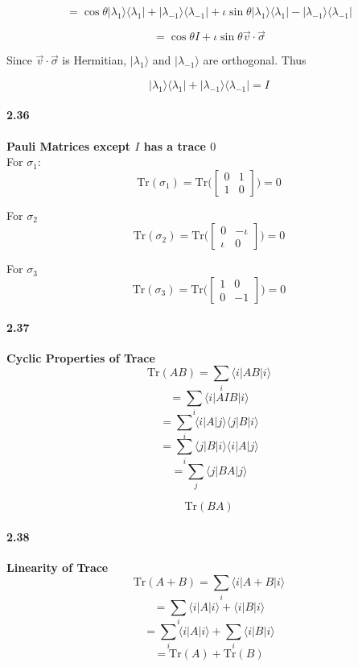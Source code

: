 $$ = \cos{\theta}|\lambda_1\rangle \langle \lambda_1| +  |\lambda_{-1} \rangle \langle \lambda_{-1}| + \iota \sin{\theta} |\lambda_1\rangle \langle \lambda_1| -  |\lambda_{-1} \rangle \langle \lambda_{-1}|  $$

$$ = \cos{\theta} I + \iota \sin{\theta} \vec{v} \cdot \vec{\sigma}$$

Since $\vec{v}\cdot \vec{\sigma}$ is Hermitian, $|\lambda_1\rangle$ and $|\lambda_{-1}\rangle$ are orthogonal. Thus

$$ |\lambda_1 \rangle \langle \lambda_1| + |\lambda_{-1}\rangle \langle \lambda_{-1}| = I$$

\paragraph{2.36} \textbf{Pauli Matrices except $I$ has a trace $0$}%
\\
For $\sigma_1$:
$$ \text{Tr}(\sigma_1) = \text{Tr}\bigg( \begin{bmatrix}
    0 & 1 \\ 1 & 0 
\end{bmatrix} \bigg) = 0 $$

For $\sigma_2$
$$ \text{Tr}(\sigma_2) = \text{Tr}\bigg( \begin{bmatrix}
    0 & -\iota \\ \iota & 0 
\end{bmatrix} \bigg) = 0 $$


For $\sigma_3$
$$ \text{Tr}(\sigma_3) = \text{Tr}\bigg( \begin{bmatrix}
    1 & 0 \\ 0 & -1 
\end{bmatrix} \bigg) = 0 $$


\paragraph{2.37} \textbf{Cyclic Properties of Trace}%
\\

$$ \text{Tr} (AB) = \sum_i \langle i |AB|i\rangle$$
$$ = \sum_i \langle i |AIB|i\rangle$$
$$  = \sum_i \langle i |A|j\rangle \langle j|B|i\rangle$$
$$  = \sum_i \langle j |B|i\rangle \langle i|A|j\rangle$$
$$ = \sum_j \langle j | BA | j \rangle$$

$$ \text{Tr}(BA)$$

\paragraph{2.38} \textbf{Linearity of Trace}%
\\
$$ \text{Tr}(A+B) = \sum_i \langle i | A+B|i \rangle$$
$$ = \sum_i \langle i | A| i \rangle +\langle i|B|i \rangle$$
$$ = \sum_i \langle i | A| i \rangle +\sum_i \langle i|B|i \rangle$$
$$ = \text{Tr}(A) + \text{Tr}(B)$$

